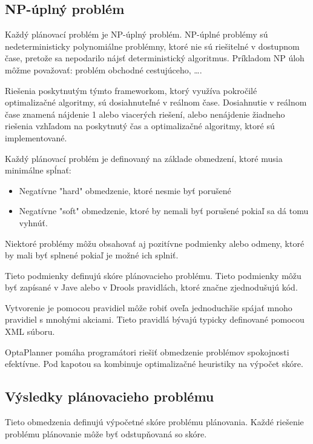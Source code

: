 \subsection{NP-úplný problém}
Každý plánovací problém je NP-úplný problém.\cite{npbook} NP-úplné problémy sú nedeterministicky polynomiálne problémny, ktoré nie sú riešitelné v dostupnom čase, pretože sa nepodarilo nájsť deterministický algoritmus. Príkladom NP úloh môžme považovať: problém obchodné cestujúceho, \ldots .

Riešenia poskytnutým týmto frameworkom, ktorý využíva pokročilé optimalizačné algoritmy, sú dosiahnuteľné v reálnom čase. Dosiahnutie v reálnom čase znamená nájdenie 1 alebo viacerých riešení, alebo nenájdenie žiadneho riešenia vzhľadom na poskytnutý čas a optimalizačné algoritmy, ktoré sú implementované.

Každý plánovací problém je definovaný na základe obmedzení, ktoré musia minimálne spĺnať: \cite{optabook}
\begin{itemize}
\item Negatívne "hard" obmedzenie, ktoré nesmie byť porušené
\item Negatívne "soft" obmedzenie, ktoré by nemali byť porušené pokiaľ sa dá tomu vyhnúť.
\end{itemize}

Niektoré problémy môžu obsahovať aj pozitívne podmienky alebo odmeny, ktoré by mali byť splnené pokiaľ je možné ich splniť.

Tieto podmienky definujú skóre plánovacieho problému. Tieto podmienky môžu byť zapísané v Jave alebo v Drools pravidlách, ktoré značne zjednodušujú kód.

 Vytvorenie je pomocou pravidiel  môže robiť  oveľa jednoduchšie spájať mnoho pravidiel s mnohými akciami. Tieto pravidlá bývajú typicky definované pomocou XML súboru.

OptaPlanner pomáha  programátori riešiť obmedzenie problémov spokojnosti efektívne. Pod kapotou sa kombinuje optimalizačné heuristiky na výpočet skóre.



\subsection{Výsledky plánovacieho problému}

Tieto obmedzenia definujú výpočetné skóre problému plánovania. Každé riešenie problému plánovanie môže byť odstupňovaná so skóre. 

